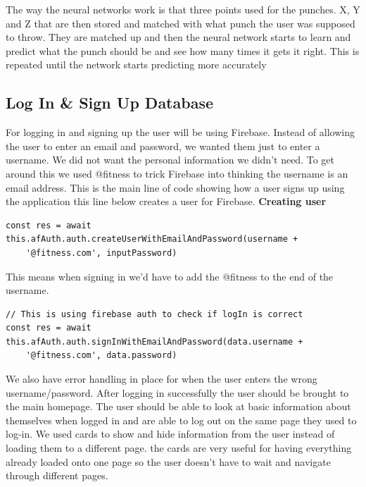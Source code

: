 \documentclass[a4paper,12pt]{report}
\begin{document}
The way the neural networks work is that three points used for the punches. X, Y and Z that are then stored and matched with what punch the user was supposed to throw. They are matched up and then the neural network starts to learn and predict what the punch should be and see how many times it gets it right. This is repeated until the network starts predicting more accurately

\subsection{Log In \& Sign Up Database}
For logging in and signing up the user will be using Firebase. Instead of allowing the user to enter an email and password, we wanted them just to enter a username. We did not want the personal information we didn't need. To get around this we used @fitness to trick Firebase into thinking the username is an email address. This is the main line of code showing how a user signs up using the application this line below creates a user for Firebase.
\newpage
\textbf{ Creating user}
\begin{verbatim}
const res = await this.afAuth.auth.createUserWithEmailAndPassword(username +
    '@fitness.com', inputPassword)
\end{verbatim}

This means when signing in we'd have to add the @fitness to the end of the username. 
\begin{verbatim}
// This is using firebase auth to check if logIn is correct
const res = await this.afAuth.auth.signInWithEmailAndPassword(data.username +
    '@fitness.com', data.password)
\end{verbatim}

We also have error handling in place for when the user enters the wrong username/password. After logging in successfully the user should be brought to the main homepage. The user should be able to look at basic information about themselves when logged in and are able to log out on the same page they used to log-in. We used cards to show and hide information from the user instead of loading them to a different page. the cards are very useful for having everything already loaded onto one page so the user doesn't have to wait and navigate through different pages.
\end{document}
